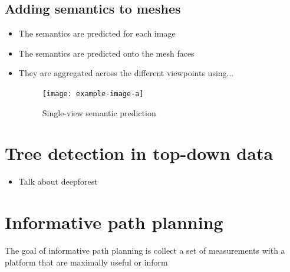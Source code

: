 \subsection{Adding semantics to meshes}
\begin{itemize}
    \item The semantics are predicted for each image
    \item The semantics are predicted onto the mesh faces
    \item They are aggregated across the different viewpoints using...

\begin{figure}
    \centering
    \texttt{[image: example-image-a]}
    \caption{Single-view semantic prediction}
    \label{fig:single-view-semantic-pred}
\end{figure}

\end{itemize}

\section{Tree detection in top-down data}
\begin{itemize}
    \item Talk about deepforest
\end{itemize}

\section{Informative path planning}



The goal of informative path planning is collect a set of measurements with a platform that are maximally useful or inform


